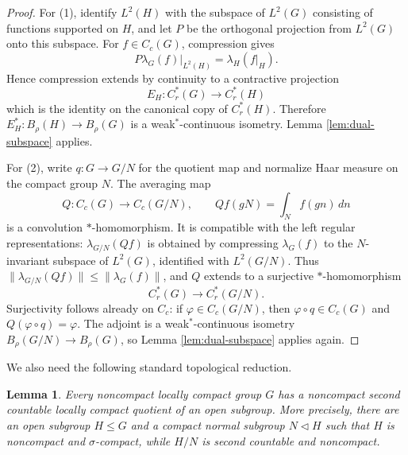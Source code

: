 \documentclass[11pt]{article}
\newtheorem{lemma}{Lemma}
\newcommand{\Br}{B_\rho}
\newcommand{\Cr}{C^*_r}
\begin{document}
\begin{proof}
For (1), identify \(L^2(H)\) with the subspace of \(L^2(G)\) consisting of
functions supported on \(H\), and let \(P\) be the orthogonal projection from
\(L^2(G)\) onto this subspace.  For \(f\in C_c(G)\), compression gives
\[
        P\lambda_G(f)|_{L^2(H)}=\lambda_H(f|_H).
\]
Hence compression extends by continuity to a contractive projection
\[
        E_H:\Cr(G)\longrightarrow \Cr(H)
\]
which is the identity on the canonical copy of \(\Cr(H)\).  Therefore
\(E_H^*:\Br(H)\to\Br(G)\) is a weak\(^*\)-continuous isometry.  Lemma
\ref{lem:dual-subspace} applies.

For (2), write \(q:G\to G/N\) for the quotient map and normalize Haar measure
on the compact group \(N\).  The averaging map
\[
        Q:C_c(G)\to C_c(G/N),\qquad
        Qf(gN)=\int_N f(gn)\,dn
\]
is a convolution \(*\)-homomorphism.  It is compatible with the left regular
representations: \(\lambda_{G/N}(Qf)\) is obtained by compressing
\(\lambda_G(f)\) to the \(N\)-invariant subspace of \(L^2(G)\), identified with
\(L^2(G/N)\).  Thus \(\|\lambda_{G/N}(Qf)\|\le \|\lambda_G(f)\|\), and \(Q\)
extends to a surjective \(*\)-homomorphism
\[
        \Cr(G)\longrightarrow \Cr(G/N).
\]
Surjectivity follows already on \(C_c\): if \(\varphi\in C_c(G/N)\), then
\(\varphi\circ q\in C_c(G)\) and \(Q(\varphi\circ q)=\varphi\).  The adjoint is
a weak\(^*\)-continuous isometry \(\Br(G/N)\to\Br(G)\), so Lemma
\ref{lem:dual-subspace} applies again.
\end{proof}

We also need the following standard topological reduction.

\begin{lemma}
\label{lem:topological-reduction}
Every noncompact locally compact group \(G\) has a noncompact second countable
locally compact quotient of an open subgroup.  More precisely, there are an
open subgroup \(H\leq G\) and a compact normal subgroup \(N\triangleleft H\)
such that \(H\) is noncompact and \(\sigma\)-compact, while \(H/N\) is
second countable and noncompact.
\end{lemma}
\end{document}
